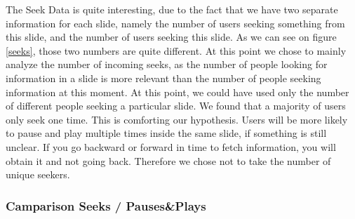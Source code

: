 \documentclass[11pt,a4paper]{article}
\begin{document}
The Seek Data is quite interesting, due to the fact that we have two separate information for each slide, namely the number of users seeking something from this slide, and the number of users seeking this slide. As we can see on figure \ref{seeks}, those two numbers are quite different. At this point we chose to mainly analyze the number of incoming seeks, as the number of people looking for information in a slide is more relevant than the number of people seeking information at this moment. At this point, we could have used only the number of different people seeking a particular slide. We found that a majority of users only seek one time. This is comforting our hypothesis. Users will be more likely to pause and play multiple times inside the same slide, if something is still unclear. If you go backward or forward in time to fetch information, you will obtain it and not going back. Therefore we chose not to take the number of unique seekers.

\subsubsection{Camparison Seeks / Pauses\&Plays}
\end{document}
